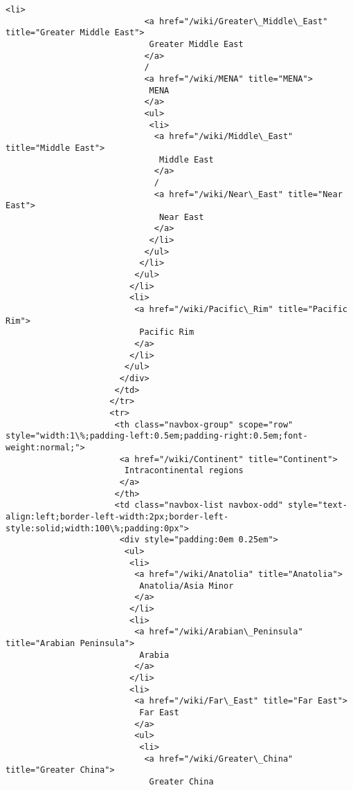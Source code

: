 \documentclass[11pt]{article}
\begin{document}
\begin{Verbatim}[commandchars=\\\{\}]
                           <li>
                            <a href="/wiki/Greater\_Middle\_East" title="Greater Middle East">
                             Greater Middle East
                            </a>
                            /
                            <a href="/wiki/MENA" title="MENA">
                             MENA
                            </a>
                            <ul>
                             <li>
                              <a href="/wiki/Middle\_East" title="Middle East">
                               Middle East
                              </a>
                              /
                              <a href="/wiki/Near\_East" title="Near East">
                               Near East
                              </a>
                             </li>
                            </ul>
                           </li>
                          </ul>
                         </li>
                         <li>
                          <a href="/wiki/Pacific\_Rim" title="Pacific Rim">
                           Pacific Rim
                          </a>
                         </li>
                        </ul>
                       </div>
                      </td>
                     </tr>
                     <tr>
                      <th class="navbox-group" scope="row" style="width:1\%;padding-left:0.5em;padding-right:0.5em;font-weight:normal;">
                       <a href="/wiki/Continent" title="Continent">
                        Intracontinental regions
                       </a>
                      </th>
                      <td class="navbox-list navbox-odd" style="text-align:left;border-left-width:2px;border-left-style:solid;width:100\%;padding:0px">
                       <div style="padding:0em 0.25em">
                        <ul>
                         <li>
                          <a href="/wiki/Anatolia" title="Anatolia">
                           Anatolia/Asia Minor
                          </a>
                         </li>
                         <li>
                          <a href="/wiki/Arabian\_Peninsula" title="Arabian Peninsula">
                           Arabia
                          </a>
                         </li>
                         <li>
                          <a href="/wiki/Far\_East" title="Far East">
                           Far East
                          </a>
                          <ul>
                           <li>
                            <a href="/wiki/Greater\_China" title="Greater China">
                             Greater China

\end{Verbatim}
\end{document}
